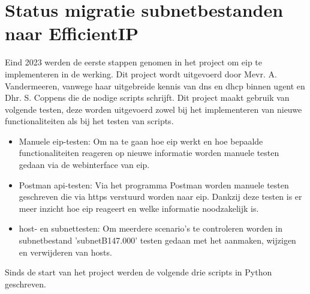 \section{Status migratie subnetbestanden naar EfficientIP}
\label{premigratie}
Eind 2023 werden de eerste stappen genomen in het project om \acrshort{eip} te implementeren in de werking. Dit project wordt uitgevoerd door Mevr. A. Vandermeeren, vanwege haar uitgebreide kennis van \acrshort{dns} en \acrshort{dhcp} binnen \acrshort{ugent} en Dhr. S. Coppens die de nodige scripts schrijft.
Dit project maakt gebruik van volgende testen, deze worden uitgevoerd zowel bij het implementeren van nieuwe functionaliteiten als bij het testen van scripts.
\begin{itemize}
    \item Manuele \acrshort{eip}-testen: Om na te gaan hoe \acrshort{eip} werkt en hoe bepaalde functionaliteiten reageren op nieuwe informatie worden manuele testen gedaan via de webinterface van \acrshort{eip}.
    \item Postman \acrshort{api}-testen: Via het programma Postman worden manuele testen geschreven die via \acrshort{https} verstuurd worden naar \acrshort{eip}. Dankzij deze testen is er meer inzicht hoe \acrshort{eip} reageert en welke informatie noodzakelijk is.
    \item host- en subnettesten: Om meerdere scenario's te controleren worden in subnetbestand 'subnetB147.000' testen gedaan met het aanmaken, wijzigen en verwijderen van hosts.
\end{itemize}
Sinds de start van het project werden de volgende drie scripts in Python geschreven.
